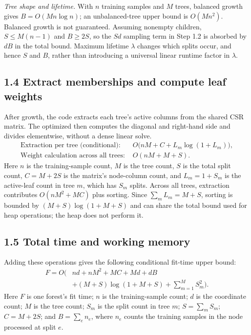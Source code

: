 \documentclass[11pt]{article}
\newcommand{\code}[1]{\texttt{\detokenize{#1}}}
\begin{document}
\emph{Tree shape and lifetime.} With $n$ training samples and $M$ trees,
balanced growth gives $B=O(Mn\log n)$; an unbalanced-tree upper bound is
$O(Mn^2)$. Balanced growth is not guaranteed. Assuming nonempty children,
$S\leq M(n-1)$ and $B\geq2S$, so the $Sd$ sampling term in Step 1.2 is absorbed
by $dB$ in the total bound. Maximum lifetime $\lambda$ changes which splits
occur, and hence $S$ and $B$, rather than introducing a universal linear
runtime factor in $\lambda$.

\subsection*{1.4 Extract memberships and compute leaf weights}
After growth, the code extracts each tree's active columns from the shared
CSR matrix. The optimized \code{_leaf_weights} then computes the diagonal and
right-hand side and divides elementwise, without a dense linear solve.
\[
\begin{aligned}
\text{Extraction per tree (conditional): }&
O\bigl(nM+C+L_m\log(1+L_m)\bigr),\\
\text{Weight calculation across all trees: }&O(nM+M+S).
\end{aligned}
\]
Here $n$ is the training-sample count, $M$ is the tree count, $S$ is the total
split count, $C=M+2S$ is the matrix's node-column count, and $L_m=1+S_m$ is
the active-leaf count in tree $m$, which has $S_m$ splits.
Across all trees, extraction contributes $O(nM^2+MC)$ plus sorting.
Since $\sum_m L_m=M+S$, sorting is bounded by $(M+S)\log(1+M+S)$ and can
share the total bound used for heap operations; the heap does not perform it.

\subsection*{1.5 Total time and working memory}
Adding these operations gives the following conditional fit-time upper bound:
\begin{equation}
\boxed{\begin{aligned}
F=O\!\bigl(&nd+nM^2+MC+Md+dB\\
&+(M+S)\log(1+M+S)+\sum_{m=1}^{M}S_m^2\bigr).
\end{aligned}}
\end{equation}
Here $F$ is one forest's fit time; $n$ is the training-sample count; $d$ is the
coordinate count; $M$ is the tree count; $S_m$ is the split count in tree $m$;
$S=\sum_m S_m$; $C=M+2S$; and $B=\sum_e n_e$, where $n_e$ counts the training
samples in the node processed at split $e$.
\end{document}
